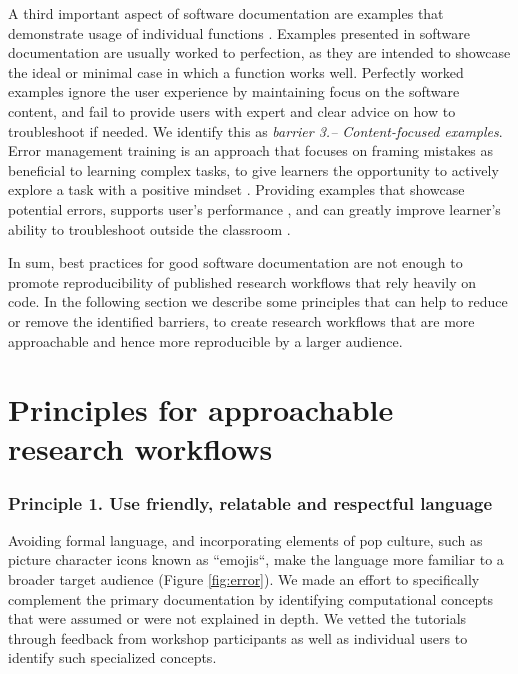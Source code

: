\documentclass[12pt]{article}
\begin{document}
A third important aspect of software documentation are examples that demonstrate usage of individual functions \citep{karimzadeh2018top}.
Examples presented in software documentation are usually worked to perfection, as they are intended to showcase the ideal or minimal case in which a function works well.
Perfectly worked examples ignore the user experience by maintaining focus on the software content, and fail to provide users with expert and clear advice on how to troubleshoot if needed.
We identify this as \textit{barrier 3.-- Content-focused examples}.
Error management training is an approach that focuses on framing mistakes as beneficial to learning complex tasks, to give learners the opportunity to
actively explore a task with a positive mindset \citep{frese1995error}.
Providing examples that showcase potential errors, supports user's performance \citep{steele2014error}, and can greatly improve learner's ability to troubleshoot outside the classroom \citep{shannon2015live, nederbragt2020ten}.


In sum, best practices for good software documentation are not enough to promote reproducibility of published research workflows that rely heavily on code.
In the following section we describe some principles that can help to reduce or remove the identified barriers, to create research workflows that are more approachable and hence more reproducible by a larger audience.

\section*{Principles for approachable research workflows}
\label{sec:addressing}

\subsubsection*{Principle 1. Use friendly, relatable and respectful language}


Avoiding formal language, and incorporating elements of pop culture, such as picture character icons known as ``emojis``, make the language more familiar to a broader target audience (Figure \ref{fig:error}). We made an effort to specifically complement the primary documentation by identifying computational concepts that were assumed or were not explained in depth.
We vetted the tutorials through feedback from workshop participants as well as individual users to identify such specialized concepts.
\end{document}

